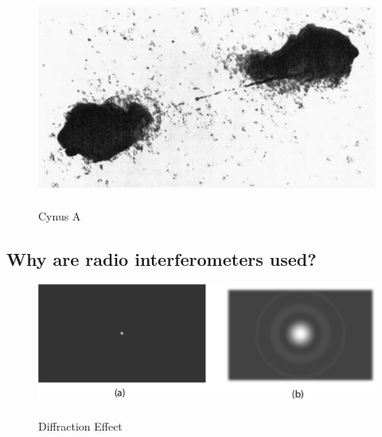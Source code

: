 \begin{figure}[htbp]

  \begin{center}
    \includegraphics[scale= 0.75]{Figures/cynus_A}
  \end{center}
  
 	\caption[Cygnus A]{\\Cynus A}
	\label{fig:CygnusA}
	
\end{figure}
\subsection{Why are radio interferometers used?}
\label{sec:intReason}
\begin{figure}[hbp]

  \begin{center}
    \includegraphics[scale= 1]{Figures/AntennaDif}
  \end{center}
  
 	\caption[Diffraction Effect]{\\Diffraction Effect}
	\label{fig:DifPat}
\end{figure}

